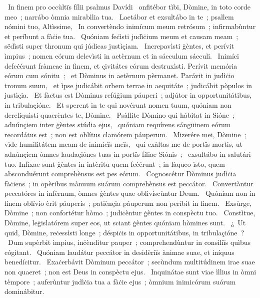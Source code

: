 {~In finem pro occùltïs fílii psalmus Davídi}
{%
~onfitébor tìbi, Dòmine, in toto corde meo~; narrábo òmnia mirabìlia tua.
~Laetábor et exsultábo in te~; psallem nómini tuo, Altìssime,
~In convertèndo inimícum meum retrósum~; infirmabùntur et períbunt a fàċie tua.
~Quóniam feċìsti judìċium meum et causam meam~; sëdìsti super thronum qui júdicas justìçiam.
~Increpavìsti ġèntes, et perívit ìmpius~; nomen eórum delevìsti in aetèrnum et in sáeculum sáeculi.
~Inimíci defeċérunt fràmeae in finem, et çivitátes eórum destruxìsti. Perívit memória eórum cum sónitu~;
~et Dòminus in aetèrnum pèrmanet. Parávit in judìċio tronum suum,
~et ìpse judicábit orbem terrae in aequitáte~; judicábit pòpulos in justìçia.
~Et fàctus est Dòminus refúġium páuperi~; adjútor in opportunitátibus, in tribulaçióne.
~Et sperent in te qui novérunt nomen tuum, quóniam non dereliquìsti quaerèntes te, Dòmine.
~Psàllite Dòmino qui hábitat in Sióne~; adnúnçiem inter ġèntes stúdia ejus,
~quóniam requírens sángüinem eórum recordátus est~; non est oblítus clamórem páuperum.
~Mizerére mei, Dòmine~; vìde humilitátem meam de inimícïs meïs,
~qui exàltas me de portïs mortis, ut adnúnçiem òmnes laudaçiónes tuas in portïs fíliae Siónis~;
~exsultábo in salutári tuo. Infíxae sunt ġèntes in intèritu quem feċérunt~; in làqueo ìsto, quem absconduérunt comprehènsus est pes eórum.
~Cognoscétur Dòminus judìċia fàċiens~; in opèribus mànuum suárum comprehènsus est peccátor.
~Convertàntur peccatóres in infèrnum, òmnes ġèntes quae obliviscùntur Deum.
~Quóniam non in finem oblívio èrit páuperis~; patiènçia páuperum non períbit in finem.
~Exsùrge, Dòmine~; non confortétur hòmo~; judicèntur ġèntes in conspèctu tuo.
~Constìtue, Dòmine, leġislatórem super eos, ut sciant ġèntes quóniam hòmines sunt.
~¿~Ut quid, Dòmine, reċessìsti longe~; déspiċis in opportunitátibus, in tribulaçióne~?
~Dum supèrbit ìmpius, inċènditur pauper~; comprehendùntur in consìliïs quìbus cógitant.
~Quóniam laudátur peccátor in desidèriïs ànimae suae, et iníquus benedícitur.
~Exaċerbávit Dòminum peccátor~; secùndum multitúdinem irae suae non quaeret~; non est Deus in conspèctu ejus.
~Inquinátae sunt viae ìllius in òmni tèmpore~; auferùntur judìċia tua a fàċie ejus~; òmnium inimicórum suórum dominábitur.
}

